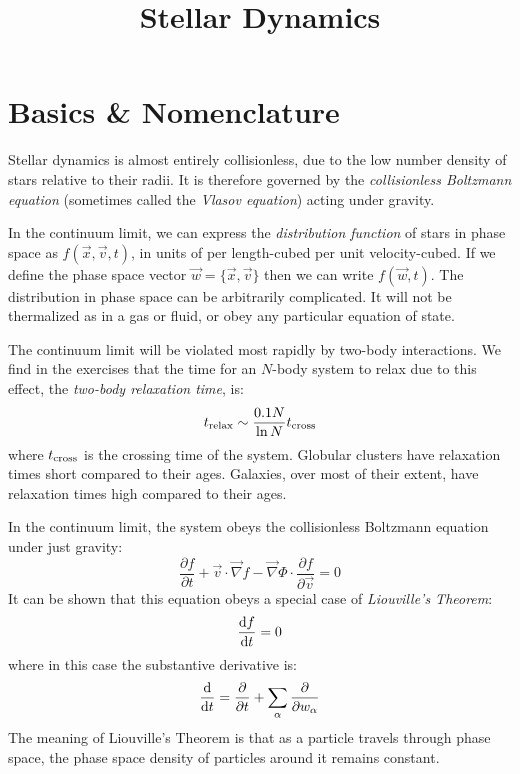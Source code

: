 \title{\bf Stellar Dynamics}


\section{Basics \& Nomenclature}

Stellar dynamics is almost entirely collisionless, due to the low
number density of stars relative to their radii. It is therefore
governed by the {\it collisionless Boltzmann equation} (sometimes
called the {\it Vlasov equation}) acting under gravity.

In the continuum limit, we can express the {\it distribution function}
of stars in phase space as $f(\vec{x}, \vec{v}, t)$, in units of per
length-cubed per unit velocity-cubed. If we define the phase space
vector $\vec{w} = \{\vec{x}, \vec{v}\}$ then we can write $f(\vec{w},
t)$. The distribution in phase space can be arbitrarily
complicated. It will not be thermalized as in a gas or fluid, or obey
any particular equation of state.

The continuum limit will be violated most rapidly by two-body
interactions. We find in the exercises that the time for an $N$-body
system to relax due to this effect, the {\it two-body relaxation
time}, is:
\begin{equation}
\label{eq:relax}
t_{\rm relax} \sim \frac{0.1 N}{\ln N} t_{\rm cross}
\end{equation}
where $t_{\rm cross}$ is the crossing time of the system. Globular
clusters have relaxation times short compared to their ages.
Galaxies, over most of their extent, have relaxation times high
compared to their ages.

In the continuum limit, the system obeys the collisionless Boltzmann
equation under just gravity:
\begin{equation}
 \frac{\partial f}{\partial t} + \vec{v}\cdot\vec{\nabla} f -
\vec{\nabla}\Phi\cdot\frac{\partial f}{\partial \vec{v}} = 0
\end{equation}
It can be shown that this equation obeys a special case of {\it
Liouville's Theorem}:
\begin{equation}
\frac{{\rm d}f}{{\rm d}t} = 0
\end{equation}
where in this case the substantive derivative is:
\begin{equation}
\frac{\rm d}{{\rm d}t} = \frac{\partial}{\partial t}
+ \sum_\alpha \frac{\partial}{\partial w_\alpha}
\end{equation}
The meaning of Liouville's Theorem is that as a particle travels
through phase space, the phase space density of particles around it
remains constant.

